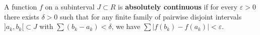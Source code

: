 A function $f$ on a subinterval $J \subset R$ is \textbf{absolutely continuous} if for every $\varepsilon > 0$ there exists $\delta > 0$ such that for any finite family of pairwise disjoint intervals $]a_k, b_k[ \subset J$ with $\sum (b_k - a_k) < \delta$, we have $\sum |f(b_k) - f(a_k)| < \varepsilon$.
